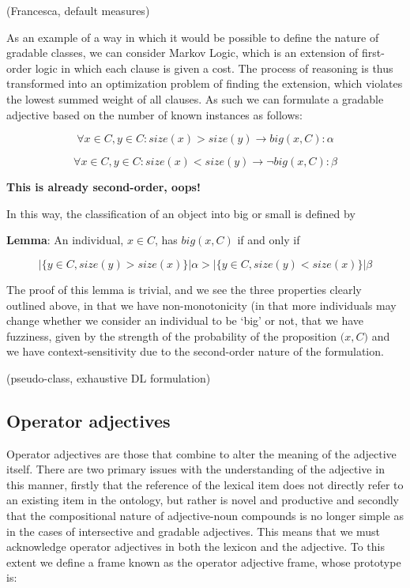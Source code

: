 \documentclass[11pt]{article}
\begin{document}
(Francesca, default measures)

As an example of a way in which it would be possible to define the nature of gradable classes, we can consider Markov Logic\cite{richardson2006markov}, which is an extension of first-order logic in which each clause is given a cost. The process of reasoning is thus transformed into an optimization problem of finding the extension, which violates the lowest summed weight of all clauses. As such we can formulate a gradable adjective based on the number of known instances as follows:

$$\forall x \in C, y \in C : size(x) > size(y) \rightarrow big(x,C) : \alpha$$

$$\forall x \in C, y \in C : size(x) < size(y) \rightarrow \neg big(x,C) : \beta$$

\textbf{This is already second-order, oops!}

In this way, the classification of an object into big or small is defined by

\noindent\textbf{Lemma}: An individual, $x \in C$, has $big(x,C)$ if and only if 

$$|\{y \in C, size(y) > size(x)\}| \alpha > |\{y \in C, size(y) < size(x)\}| \beta$$

The proof of this lemma is trivial, and we see the three properties clearly outlined above, in that we have non-monotonicity (in that more individuals may change whether we consider an individual to be `big' or not, that we have fuzziness, given by the strength of the probability of the proposition $\big(x,C)$ and we have context-sensitivity due to the second-order nature of the formulation.

(pseudo-class, exhaustive DL formulation)

\subsection{Operator adjectives}

Operator adjectives are those that combine to alter the meaning of the adjective itself. There are two primary issues with the understanding of the adjective in this manner, firstly that the reference of the lexical item does not directly refer to an existing item in the ontology, but rather is novel and productive and secondly that the compositional nature of adjective-noun compounds is no longer simple as in the cases of intersective and gradable adjectives. This means that we must acknowledge operator adjectives in both the lexicon and the adjective. To this extent we define a frame known as the operator adjective frame, whose prototype is:
\end{document}
